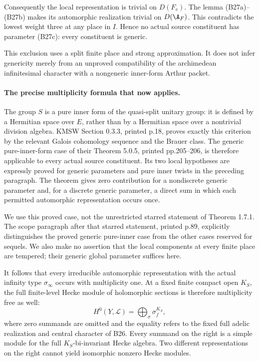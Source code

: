 \documentclass[11pt]{article}
\providecommand{\mathscr}[1]{\mathcal{#1}}
\theoremstyle{definition}\newtheorem{definition}[theorem]{Definition}\newtheorem{remark}[theorem]{Remark}
\begin{document}
Consequently the local representation is trivial on $D(F_v)$.
The lemma (B27a)--(B27b) makes its automorphic realization
trivial on $D(\A_F)$.  This contradicts the lowest weight three
at any place in $I$.  Hence no actual source constituent has
parameter (B27c): every constituent is generic.

This exclusion uses a split finite place and strong approximation.
It does not infer genericity merely from an unproved compatibility
of the archimedean infinitesimal character with a nongeneric
inner-form Arthur packet.

\paragraph{The precise multiplicity formula that now applies.}
The group $S$ is a pure inner form of the quasi-split unitary
group: it is defined by a Hermitian space over $E$, rather than
by a Hermitian space over a nontrivial division algebra.
KMSW Section 0.3.3, printed p.18, proves exactly this criterion
by the relevant Galois cohomology sequence and the Brauer class.
The generic pure-inner-form case of their Theorem 5.0.5,
printed pp.205--206, is therefore applicable to every actual
source constituent.  Its two local hypotheses are expressly
proved for generic parameters and pure inner twists in the
preceding paragraph.  The theorem gives zero contribution for
a nondiscrete generic parameter and, for a discrete generic
parameter, a direct sum in which each permitted automorphic
representation occurs once.

We use this proved case, not the unrestricted starred statement
of Theorem 1.7.1.  The scope paragraph after that starred
statement, printed p.89, explicitly distinguishes the proved
generic pure-inner case from the other cases reserved for
sequels.  We also make no assertion that the local components
at every finite place are tempered; their generic global
parameter suffices here.

It follows that every irreducible automorphic representation
with the actual infinity type $\sigma_\infty$ occurs with
multiplicity one.  At a fixed finite compact open $K_S$, the
full finite-level Hecke module of holomorphic sections is
therefore multiplicity free as well:
\[
          H^0(Y,\mathscr L)
              =\bigoplus_{\sigma}
                    \sigma_f^{K_S},
 \tag{B27e}
\]
where zero summands are omitted and the equality refers to the
fixed full adelic realization and central character of B26.
Every summand on the right is a simple module for the full
$K_S$-bi-invariant Hecke algebra.  Two different representations
on the right cannot yield isomorphic nonzero Hecke modules.
\end{document}
